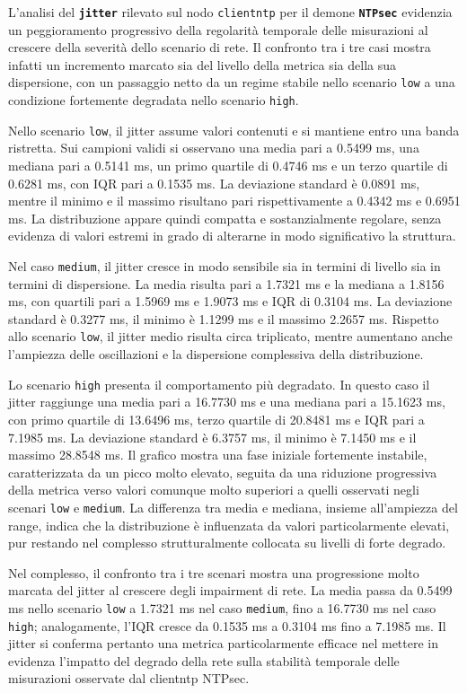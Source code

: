 L’analisi del \texttt{\textbf{jitter}} rilevato sul nodo \texttt{clientntp} per
il demone \texttt{\textbf{NTPsec}} evidenzia un peggioramento progressivo della regolarità
temporale delle misurazioni al crescere della severità dello scenario di rete.
Il confronto tra i tre casi mostra infatti un incremento marcato sia del livello
della metrica sia della sua dispersione, con un passaggio netto da un regime stabile
nello scenario \texttt{low} a una condizione fortemente degradata nello scenario
\texttt{high}.

Nello scenario \texttt{low}, il jitter assume valori contenuti e si mantiene entro
una banda ristretta. Sui campioni validi si osservano una media pari a 0.5499 ms,
una mediana pari a 0.5141 ms, un primo quartile di 0.4746 ms e un terzo quartile
di 0.6281 ms, con IQR pari a 0.1535 ms. La deviazione standard è 0.0891 ms, mentre
il minimo e il massimo risultano pari rispettivamente a 0.4342 ms e 0.6951 ms.
La distribuzione appare quindi compatta e sostanzialmente regolare, senza evidenza
di valori estremi in grado di alterarne in modo significativo la struttura.

Nel caso \texttt{medium}, il jitter cresce in modo sensibile sia in termini di livello
sia in termini di dispersione. La media risulta pari a 1.7321 ms e la mediana a
1.8156 ms, con quartili pari a 1.5969 ms e 1.9073 ms e IQR di 0.3104 ms. La
deviazione standard è 0.3277 ms, il minimo è 1.1299 ms e il massimo 2.2657 ms.
Rispetto allo scenario \texttt{low}, il jitter medio risulta circa triplicato, mentre
aumentano anche l’ampiezza delle oscillazioni e la dispersione complessiva della distribuzione.

Lo scenario \texttt{high} presenta il comportamento più degradato. In questo caso
il jitter raggiunge una media pari a 16.7730 ms e una mediana pari a 15.1623 ms,
con primo quartile di 13.6496 ms, terzo quartile di 20.8481 ms e IQR pari a 7.1985
ms. La deviazione standard è 6.3757 ms, il minimo è 7.1450 ms e il massimo 28.8548
ms. Il grafico mostra una fase iniziale fortemente instabile, caratterizzata da un
picco molto elevato, seguita da una riduzione progressiva della metrica verso
valori comunque molto superiori a quelli osservati negli scenari \texttt{low} e \texttt{medium}.
La differenza tra media e mediana, insieme all’ampiezza del range, indica che la distribuzione
è influenzata da valori particolarmente elevati, pur restando nel complesso
strutturalmente collocata su livelli di forte degrado.

Nel complesso, il confronto tra i tre scenari mostra una progressione molto marcata
del jitter al crescere degli impairment di rete. La media passa da 0.5499 ms
nello scenario \texttt{low} a 1.7321 ms nel caso \texttt{medium}, fino a 16.7730 ms
nel caso \texttt{high}; analogamente, l’IQR cresce da 0.1535 ms a 0.3104 ms fino
a 7.1985 ms. Il jitter si conferma pertanto una metrica particolarmente efficace nel
mettere in evidenza l’impatto del degrado della rete sulla stabilità temporale delle
misurazioni osservate dal clientntp NTPsec.

